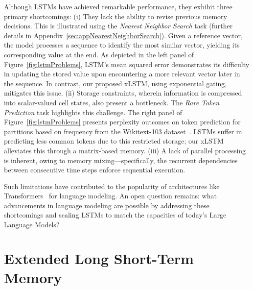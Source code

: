 Although LSTMs have achieved remarkable performance, they exhibit three primary shortcomings: (i) They lack the ability to revise previous memory decisions. This is illustrated using the {\it Nearest Neighbor Search} task (further details in Appendix~\ref{sec:appNearestNeighborSearch}). Given a reference vector, the model processes a sequence to identify the most similar vector, yielding its corresponding value at the end. As depicted in the left panel of Figure~\ref{fig:lstmProblems}, LSTM’s mean squared error demonstrates its difficulty in updating the stored value upon encountering a more relevant vector later in the sequence. In contrast, our proposed xLSTM, using exponential gating, mitigates this issue. (ii) Storage constraints, wherein information is compressed into scalar-valued cell states, also present a bottleneck. The {\it Rare Token Prediction} task highlights this challenge. The right panel of Figure~\ref{fig:lstmProblems} presents perplexity outcomes on token prediction for partitions based on frequency from the Wikitext-103 dataset~\citep{Merity:17}. LSTMs suffer in predicting less common tokens due to this restricted storage; our xLSTM alleviates this through a matrix-based memory. (iii) A lack of parallel processing is inherent, owing to memory mixing—specifically, the recurrent dependencies between consecutive time steps enforce sequential execution.

Such limitations have contributed to the popularity of architectures like Transformers~\citep{Vaswani:17} for language modeling. An open question remains: what advancements in language modeling are possible by addressing these shortcomings and scaling LSTMs to match the capacities of today’s Large Language Models?

\section{Extended Long Short-Term Memory}
\label{sec:xLSTM}

